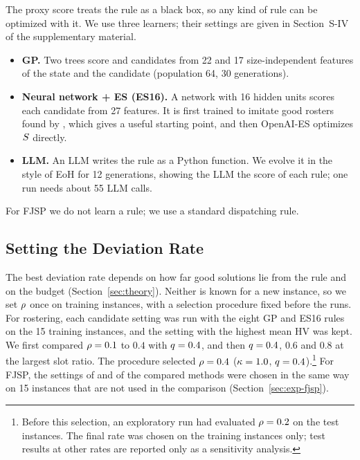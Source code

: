 The proxy score treats the rule as a black box, so any kind of rule can be optimized with it.
We use three learners; their settings are given in Section~S-IV of the supplementary material.
\begin{itemize}
  \item \textbf{GP.} Two trees score \reuse and \new candidates from 22 and 17 size-independent features of the state and the candidate (population 64, 30 generations).
  \item \textbf{Neural network + ES (ES16).} A network with 16 hidden units scores each candidate from 27 features.
  It is first trained to imitate good rosters found by , which gives a useful starting point, and then OpenAI-ES \cite{salimans2017evolution} optimizes $S$ directly.
  \item \textbf{LLM.} An LLM writes the rule as a Python function. We evolve it in the style of EoH \cite{liu2024evolution} for 12 generations, showing the LLM the score of each rule; one run needs about 55 LLM calls.
\end{itemize}
For FJSP we do not learn a rule; we use a standard dispatching rule.

\subsection{Setting the Deviation Rate}
\label{sec:method:k}

The best deviation rate depends on how far good solutions lie from the rule and on the budget (Section~\ref{sec:theory}).
Neither is known for a new instance, so we set $\rho$ once on training instances, with a selection procedure fixed before the runs.
For rostering, each candidate setting was run with the eight GP and ES16 rules on the 15 training instances,
and the setting with the highest mean HV was kept.
We first compared $\rho = 0.1$ to $0.4$ with $q = 0.4$, and then $q = 0.4$, 0.6 and 0.8 at the largest slot ratio.
The procedure selected $\rho = 0.4$ ($\kappa = 1.0$, $q = 0.4$).\footnote{Before this selection, an exploratory run had evaluated $\rho = 0.2$ on the test instances. The final rate was chosen on the training instances only; test results at other rates are reported only as a sensitivity analysis.}
For FJSP, the settings of \RDD and of the compared methods were chosen in the same way on 15 instances that are not used in the comparison (Section~\ref{sec:exp-fjsp}).
